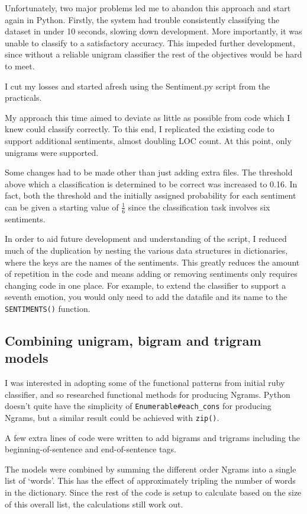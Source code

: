 \documentclass[a4paper,oneside]{article}
\begin{document}
Unfortunately, two major problems led me to abandon this approach and start
again in Python. Firstly, the system had trouble consistently classifying the
dataset in under 10 seconds, slowing down development. More importantly, it was
unable to classify to a satisfactory accuracy. This impeded further
development, since without a reliable unigram classifier the rest of the
objectives would be hard to meet.

I cut my losses and started afresh using the Sentiment.py script from the
practicals.

My approach this time aimed to deviate as little as possible from code which I
knew could classify correctly. To this end, I replicated the existing code to
support additional sentiments, almost doubling LOC count. At this point, only
unigrams were supported.

Some changes had to be made other than just adding extra files. The threshold
above which a classification is determined to be correct was increased to 0.16.
In fact, both the threshold and the initially assigned probability for each
sentiment can be given a starting value of $\frac{1}{6}$ since the
classification task involves six sentiments.

In order to aid future development and understanding of the script, I reduced
much of the duplication by nesting the various data structures in dictionaries,
where the keys are the names of the sentiments. This greatly reduces the amount
of repetition in the code and means adding or removing sentiments only requires
changing code in one place. For example, to extend the classifier to support a
seventh emotion, you would only need to add the datafile and its name to the
\verb!SENTIMENTS()! function.

\subsection{Combining unigram, bigram and trigram models}

I was interested in adopting some of the functional patterns from initial ruby
classifier, and so researched functional methods for producing Ngrams. Python
doesn't quite have the simplicity of \verb!Enumerable#each_cons! for producing
Ngrams, but a similar result could be achieved with \verb!zip()!.

A few extra lines of code were written to add bigrams and trigrams including
the beginning-of-sentence and end-of-sentence tags.

The models were combined by summing the different order Ngrams into a single
list of `words'. This has the effect of approximately tripling the number of
words in the dictionary. Since the rest of the code is setup to calculate based
on the size of this overall list, the calculations still work out.
\end{document}
